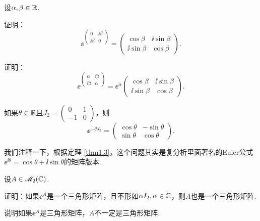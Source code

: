 \begin{problem}
  设$\alpha,\beta\in\mathbb R$.
  \begin{enum}
    \item 证明：
    \[
      \ee^{\begin{pmatrix}
        0 & \ii\beta \\
        \ii\beta & 0
      \end{pmatrix}} = \begin{pmatrix}
        \cos\beta & \ii\sin\beta \\
        \ii\sin\beta & \cos\beta
      \end{pmatrix}.
    \]
    \item 证明：
    \[
      \ee^{\begin{pmatrix}
        \alpha & \ii\beta \\
        \ii\beta & \alpha
      \end{pmatrix}} = \ee^{\alpha}\begin{pmatrix}
        \cos\beta & \ii\sin\beta \\
        \ii\sin\beta & \cos\beta
      \end{pmatrix}.
    \]
  \end{enum}
\end{problem}

\begin{mybox}
  \begin{problem}[一个指数形式的旋转矩阵.]

    如果$\theta\in\mathbb R$且$J_2=\begin{pmatrix}
      0 & 1 \\
      -1 & 0
    \end{pmatrix}$，则
    \[
      \ee^{-\theta J_2} = \begin{pmatrix}
        \cos\theta & -\sin\theta \\
        \sin\theta & \cos\theta
      \end{pmatrix}.
    \]
  \end{problem}
\end{mybox}
\begin{remark}
  我们注释一下，根据定理 \ref{thm1.3}，这个问题其实是复分析里面著名的Euler公式$\ee^{\ii\theta}=\cos\theta+\ii\sin\theta$的矩阵版本.
\end{remark}

\begin{problem}
  设$A\in\mathscr M_2(\mathbb C)$.
  \begin{enum}
    \item 证明：如果$\ee^A$是一个三角形矩阵，且不形如$\alpha I_2,\alpha\in\mathbb C$，则$A$也是一个三角形矩阵.
    \item 说明如果$\ee^A$是三角形矩阵，$A$不一定是三角形矩阵.
  \end{enum}
\end{problem}

